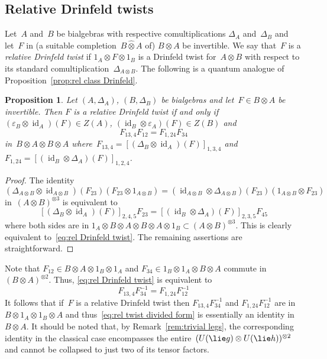 \documentclass[12pt, reqno]{amsart}
\newcommand{\wh}[1]{\widehat{#1}}
\newtheorem{proposition}[theorem]{Proposition}
\theoremstyle{definition}
\numberwithin{equation}{section}
\newcommand{\tensor}{\otimes}
\DeclareMathOperator{\id}{id}
\begin{document}
\subsection{Relative Drinfeld twists}\label{subs:rel twist}
Let~$A$ and~$B$ be bialgebras with respective comultiplications $\Delta_A$ and~$\Delta_B$ and 
let~$F$ in (a suitable completion~$B\wh\tensor A$ of) $B\tensor A$ be invertible. We say that~$F$ is a {\em relative Drinfeld twist} if $1_A\tensor F\tensor 1_B$ is a Drinfeld twist for~$A\tensor B$ with respect to its standard comultiplication~$\Delta_{A\tensor B}$.
The following is a quantum analogue of Proposition~\ref{prop:rel class Drinfeld}.
\begin{proposition}\label{prop:rel Drinfeld twist}
Let $(A,\Delta_A)$, $(B,\Delta_B)$ be 
bialgebras and let~$F\in B\tensor A$ be invertible. Then $F$
is a relative Drinfeld twist if and only if
$(\varepsilon_B\tensor\id_A)(F)\in Z(A)$, $(\id_B\tensor\varepsilon_A)(F)\in Z(B)$
and
\begin{equation}\label{eq:rel Drinfeld twist}
F_{13,4}F_{12}=F_{1,24}F_{34}
\end{equation}
in~$B\tensor A\tensor B\tensor A$ where~$F_{13,4}=
[(\Delta_B\tensor \id_A)(F)]_{1,3,4}$ and~$
F_{1,24}=
[(\id_B\tensor \Delta_A)(F)]_{1,2,4}$.
\end{proposition}
\begin{proof}
The identity
$$
(\Delta_{A\tensor B}\tensor \id_{A\tensor B})(F_{23})(F_{23}\tensor 1_{A\tensor B})=
(\id_{A\tensor B}\tensor\Delta_{A\tensor B})(F_{23})(1_{A\tensor B}\tensor F_{23})
$$
in~$(A\tensor B)^{\tensor 3}$ is equivalent to 
$$
[(\Delta_B\tensor\id_A)(F)]_{2,4,5}F_{23}=
[(\id_B\tensor\Delta_A)(F)]_{2,3,5}F_{45}
$$
where both sides are in $1_A\tensor B\tensor A\tensor B\tensor A\tensor 1_B\subset (A\tensor B)^{\tensor 3}$. This 
is clearly equivalent to~\eqref{eq:rel Drinfeld twist}. The remaining assertions are straightforward.
\end{proof}
Note that $F_{12}\in B\tensor A\tensor 1_B\tensor 1_A$ and $F_{34}\in 
1_B\tensor 1_A\tensor B\tensor A$ commute in $(B\tensor A)^{\tensor 2}$. Thus, \eqref{eq:rel Drinfeld twist} is equivalent to 
\begin{equation}\label{eq:rel twist divided form}
F_{13,4}F_{34}^{-1}=F_{1,24}F_{12}^{-1}
\end{equation}
It follows that if~$F$ is a relative Drinfeld twist then $F_{13,4}F_{34}^{-1}$ and
$F_{1,24}F_{12}^{-1}$ are in $B\tensor 1_A\tensor 1_B\tensor A$ and thus~\eqref{eq:rel twist divided form} is essentially an identity in~$B\tensor A$. It should be noted that, by Remark~\ref{rem:trivial legs},  the corresponding identity in the classical case encompasses the entire~$(U(\lie g)\tensor U(\lie h))^{\tensor 2}$ and cannot be collapsed to just two of its tensor factors.
\end{document}
